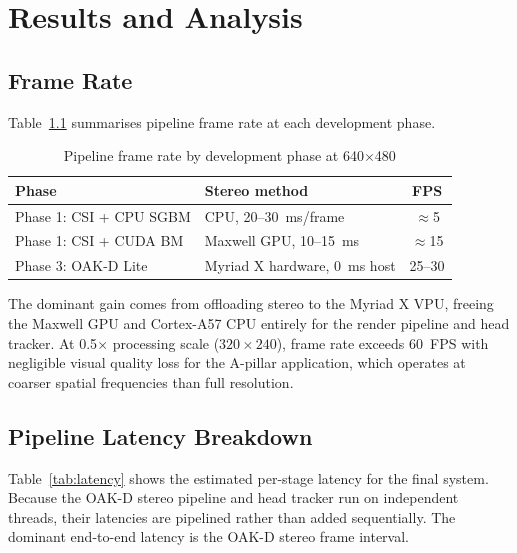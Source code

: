 \documentclass[11pt, a4paper]{report}
\begin{document}
\chapter{Results and Analysis}

\section{Frame Rate}

Table~\ref{tab:fps_comparison} summarises pipeline frame rate at each
development phase.

\begin{table}[h]
\centering
\caption{Pipeline frame rate by development phase at 640$\times$480}
\label{tab:fps_comparison}
\begin{tabular}{@{}p{4cm}p{4.5cm}c@{}}
\toprule
Phase & Stereo method & FPS \\
\midrule
Phase 1: CSI + CPU SGBM    & CPU, 20--30~ms/frame    & $\approx$5 \\
Phase 1: CSI + CUDA BM     & Maxwell GPU, 10--15~ms  & $\approx$15 \\
Phase 3: OAK-D Lite        & Myriad X hardware, 0~ms host & 25--30 \\
\bottomrule
\end{tabular}
\end{table}

The dominant gain comes from offloading stereo to the Myriad X VPU,
freeing the Maxwell GPU and Cortex-A57 CPU entirely for the render
pipeline and head tracker.
At 0.5$\times$ processing scale ($320\times240$), frame rate exceeds
60~FPS with negligible visual quality loss for the A-pillar application,
which operates at coarser spatial frequencies than full resolution.

\section{Pipeline Latency Breakdown}

Table~\ref{tab:latency} shows the estimated per-stage latency for the
final system.
Because the OAK-D stereo pipeline and head tracker run on independent
threads, their latencies are pipelined rather than added sequentially.
The dominant end-to-end latency is the OAK-D stereo frame interval.
\end{document}
